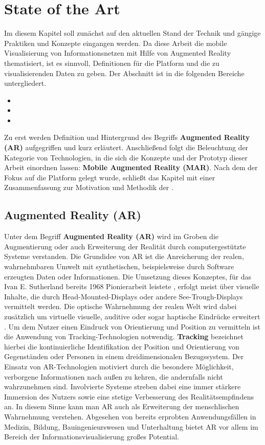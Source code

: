 %
\chapter{State of the Art}
\label{sec:sota}
Im diesem Kapitel soll zunächst auf den aktuellen Stand der Technik und gängige Praktiken und Konzepte eingangen werden. Da diese Arbeit die mobile Visualisierung von Informationsnetzen mit Hilfe von Augmented Reality thematisiert, ist es sinnvoll, Definitionen für die Platform und die zu visualisierenden Daten zu geben. Der Abschnitt ist in die folgenden Bereiche untergliedert.
\begin{itemize}
	\item {}
	\item {}
	\item {} 
\end{itemize}
Zu erst werden Definition und Hintergrund des Begriffs \textbf {Augmented Reality (AR)} aufgegriffen und kurz erläutert. Anschließend folgt die Beleuchtung der Kategorie von Technologien, in die sich die Konzepte und der Prototyp dieser Arbeit einordnen lassen: \textbf{Mobile Augmented Reality (MAR)}. Nach dem der Fokus auf die Platform gelegt wurde, schließt das Kapitel mit einer Zusammenfassung zur Motivation und Methodik der \textbf{}.
\section{Augmented Reality (AR)}
\label{sec:sota:ar}
Unter dem Begriff \textbf{Augmented Reality (AR)} wird im Groben die Augmentierung oder auch Erweiterung der Realität durch computergestützte Systeme verstanden. Die Grundidee von AR ist die Anreicherung der realen, wahrnehmbaren Umwelt mit synthetischen, beispielsweise durch Software erzeugten Daten oder Informationen. Die Umsetzung dieses Konzeptes, für das Ivan E. Sutherland bereits 1968 Pionierarbeit leistete \cite{Sutherland1968}, erfolgt meist über visuelle Inhalte, die durch Head-Mounted-Displays oder andere See-Trough-Displays vermittelt werden. Die optische Wahrnehmung der realen Welt wird dabei zusätzlich um virtuelle visuelle, auditive oder sogar haptische Eindrücke erweitert \cite{Feiner1997}. Um dem Nutzer einen Eindruck von Orientierung und Position zu vermitteln ist die Anwendung von Tracking-Technologien notwendig. \textbf{Tracking} bezeichnet hierbei die kontinuierliche Identifikation der Position und Orientierung \cite{Perey2013} von Gegenständen oder Personen in einem dreidimensionalen Bezugssystem.
Der Einsatz von AR-Technologien motiviert durch die besondere Möglichkeit, verborgene Informationen nach außen zu kehren, die andernfalls nicht wahrzunehmen sind. Involvierte Systeme streben dabei eine immer stärkere Immersion des Nutzers sowie eine stetige Verbesserung des Realitätsempfindens an. In diesem Sinne kann man AR auch als Erweiterung der menschlischen Wahrnehmung verstehen. Abgesehen von bereits erprobten Anwendungsfällen in Medizin, Bildung, Bauingenieurswesen und Unterhaltung bietet AR vor allem im Bereich der Informationsvisualisierung großes Potential. 

